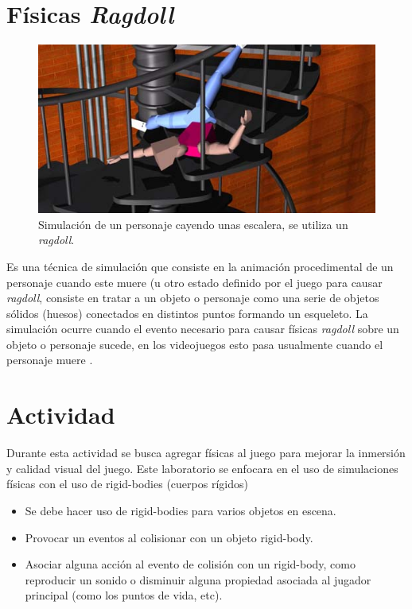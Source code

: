 \section{Físicas \emph{Ragdoll}}
\setlength\intextsep{0pt}
\begin{figure}
\includegraphics[width=\linewidth]{media/ragdoll.jpg}
\caption{Simulación de un personaje cayendo unas escalera, se utiliza un \emph{ragdoll}.}
\label{fig:ragdoll}
\end{figure}
Es una técnica de simulación que consiste en la animación procedimental de un personaje cuando este muere (u otro estado definido por el juego para causar \emph{ragdoll}, consiste en tratar a un objeto o personaje como una serie de objetos sólidos (huesos) conectados en distintos puntos formando un esqueleto. La simulación ocurre cuando el evento necesario para causar físicas \emph{ragdoll} sobre un objeto o personaje sucede, en los videojuegos esto pasa usualmente cuando el personaje muere \cite{eric_ragdoll}.

\section{Actividad}
Durante esta actividad se busca agregar físicas al juego para mejorar la inmersión y calidad visual del juego. Este laboratorio se enfocara en el uso de simulaciones físicas con el uso de rigid-bodies (cuerpos rígidos)
\begin{itemize}
\item Se debe hacer uso de rigid-bodies para varios objetos en escena.
\item Provocar un eventos al colisionar con un objeto rigid-body.
\item Asociar alguna acción al evento de colisión con un rigid-body, como reproducir un sonido o disminuir alguna propiedad asociada al jugador principal (como los puntos de vida, etc).
\end{itemize}
